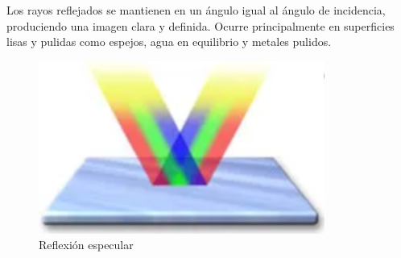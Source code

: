 Los rayos reflejados se mantienen en un ángulo igual al ángulo de incidencia, produciendo una imagen clara y definida. Ocurre principalmente en superficies lisas y pulidas como espejos, agua en equilibrio y metales pulidos.

\begin{figure}[H]
  \centering
  \includegraphics[scale=0.5]{imagenes/reflexion_especular.png}
  \caption{Reflexión especular\cite{sncrflspcdif}}
\end{figure}
